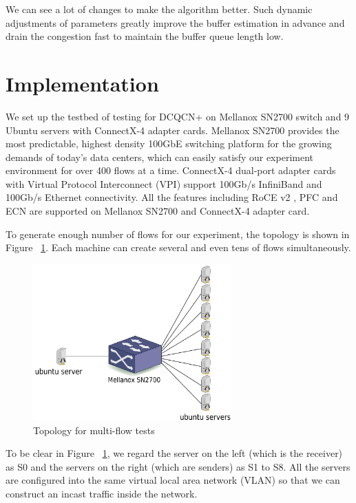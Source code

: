 \documentclass[12pt,a4paper]{article}
\begin{document}
We can see a lot of changes to make the algorithm better.
Such dynamic adjustments of parameters greatly improve the buffer estimation in advance and drain the congestion fast
to maintain the buffer queue length low.

\newpage
\section{Implementation}

We set up the testbed of testing for DCQCN+ on Mellanox SN2700 switch and 9 Ubuntu servers with ConnectX-4 adapter cards.
Mellanox SN2700 provides the most predictable,
highest density 100GbE switching platform for the growing demands of today's data centers,
which can easily satisfy our experiment environment for over 400 flows at a time.
ConnectX-4 dual-port adapter cards with Virtual Protocol Interconnect (VPI) support 100Gb/s InfiniBand and 100Gb/s Ethernet connectivity.
All the features including RoCE v2 \cite{RoCEv2}, PFC and ECN are supported on Mellanox SN2700 and ConnectX-4 adapter card.

To generate enough number of flows for our experiment, the topology is shown in Figure ~\ref{fig:Topology}.
Each machine can create several and even tens of flows simultaneously.

\begin{figure}[h!]
	\begin{center}
		\includegraphics[width=3in]{Topology}
		\caption{Topology for multi-flow tests}
		\label{fig:Topology}
	\end{center}
\end{figure}

To be clear in Figure ~\ref{fig:Topology},
we regard the server on the left (which is the receiver) as S0 and the servers on the right (which are senders) as S1 to S8.
All the servers are configured into the same virtual local area network (VLAN) so that we can construct an incast traffic inside the network.
\end{document}
